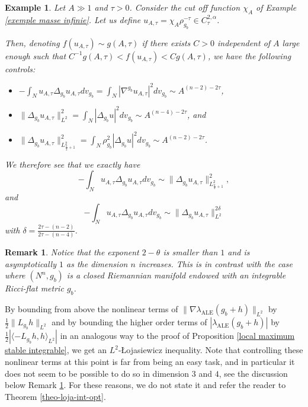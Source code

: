 \documentclass[a4paper,11pt,reqno]{amsart}
\newtheorem{rk}[defn]{Remark}
\newtheorem{exmp}[defn]{Example}
\numberwithin{equation}{section}
\begin{document}
\begin{exmp}
    Let $A\gg 1$ and $\tau>0$. Consider the cut off function $\chi_A$ of Example \ref{exemple masse infinie}. Let us define $u_{A,\tau} = \chi_A \rho_{g_b}^{-\tau}\in C^{2,\alpha}_{\tau}$.
    
    Then, denoting $f(u_{A,\tau})\sim g(A,\tau)$ if there exists $C>0$ independent of $A$ large enough such that $C^{-1}g(A,\tau)<f(u_{A,\tau})<Cg(A,\tau)$, we have the following controls:
    \begin{itemize}
        \item $-\int_{N}u_{A,\tau}\Delta_{g_b} u_{A,\tau}dv_{g_b}=\int_{N}|\nabla^{g_b} u_{A,\tau}|^2dv_{g_b} \sim A^{(n-2)-2\tau}$,
        \item $\|\Delta_{g_b} u_{A,\tau}\|_{L^2}^2=\int_{N}|\Delta_{g_b} u|^2dv_{g_b} \sim A^{(n-4)-2\tau}$, and
        \item $\|\Delta_{g_b} u_{A,\tau}\|_{L^2_{\frac{n}{2}+1}}^2=\int_{N}\rho_{g_b}^2|\Delta_{g_b} u|^2dv_{g_b} \sim A^{(n-2)-2\tau}$.
    \end{itemize}
    We therefore see that we exactly have 
    $$-\int_{N}u_{A,\tau}\Delta_{g_b} u_{A,\tau}dv_{g_b}\sim \|\Delta_{g_b} u_{A,\tau}\|_{L^2_{\frac{n}{2}+1}}^2, $$
     and 
    $$-\int_{N}u_{A,\tau}\Delta_{g_b} u_{A,\tau}dv_{g_b}\sim \|\Delta_{g_b} u_{A,\tau}\|_{L^2}^{2\delta}$$
    with $\delta = \frac{2\tau-(n-2)}{2\tau-(n-4)}$.
\end{exmp}
	
	
	\begin{rk}\label{rk-exp-loja}
		Notice that the exponent $2-\theta$ is smaller than $1$ and is asymptotically $1$ as the dimension $n$ increases. This is in contrast with the case where $(N^n,g_b)$ is a closed Riemannian manifold endowed with an integrable Ricci-flat metric $g_b$.
	\end{rk}
	
	By bounding from above the nonlinear terms of $\|\nabla\lambda_{\operatorname{ALE}}(g_b+h)\|_{L^2}$ by $\frac{1}{2}\|L_{g_b}h\|_{L^2}$ and by bounding the higher order terms of $|\lambda_{\operatorname{ALE}}(g_b+h)|$ by $\frac{1}{2}|\langle-L_{g_b}h,h\rangle_{L^2}|$ in an analogous way to the proof of Proposition \ref{local maximum stable integrable}, we get an $L^2$-\L{}ojasiewicz inequality. Note that controlling these nonlinear terms at this point is far from being an easy task, and in particular it does not seem to be possible to do so in dimension $3$ and $4$, see the discussion below Remark \ref{rk-exp-loja}. For these reasons, we do not state it and refer the reader to Theorem \ref{theo-loja-int-opt}.
	
\end{document}
